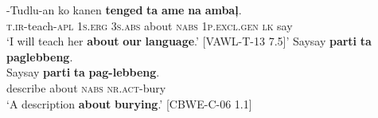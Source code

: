  \gll \emptyset{}-Tudlu-an  ko  kanen  \textbf{tenged}  \textbf{ta}  \textbf{ame}  \textbf{na}  \textbf{ambaļ}. \\
\textsc{t.ir}-teach-\textsc{apl}  1\textsc{s.erg}  3\textsc{s.abs}  about  \textsc{nabs}  1\textsc{p.excl.gen}  \textsc{lk}  say \\
\glt ‘I will teach her \textbf{about} \textbf{our} \textbf{language}.’ [VAWL-T-13 7.5]’\label{bkm:Ref423444714}
\z
\ea
\label{bkm:Ref423444699}
Saysay  \textbf{parti}  \textbf{ta}  \textbf{paglebbeng}. \\\smallskip
 \gll Saysay  \textbf{parti}  \textbf{ta}  \textbf{pag-lebbeng}. \\
describe  about  \textsc{nabs}  \textsc{nr.act}-bury \\
\glt ‘A description \textbf{about} \textbf{burying}.’ [CBWE-C-06 1.1]
\z


